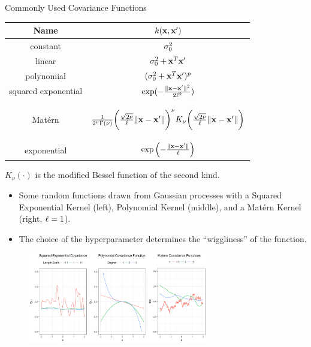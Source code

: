 \begin{frame}[c,allowframebreaks]{Commonly Used Covariance Functions}


\begin{table}[]
\centering
\begin{tabular}{|c|c|}
\hline
Name & $k(\mathbf{x}, \mathbf{x}^\prime)$\\
\hline
constant & $\sigma^2_0$ \\ [1em]
linear & $\sigma^2_0 + \mathbf{x}^T\mathbf{x}^\prime$ \\ [1em]
polynomial & $(\sigma^2_0 + \mathbf{x}^T\mathbf{x}^\prime)^p$ \\ [1em]
squared exponential & $\exp(- \frac{\|\mathbf{x} - \mathbf{x}^\prime\|^2}{2\ell^2})$ \\ [1em]
Matérn & \begin{footnotesize} $\frac{1}{2^\nu \Gamma(\nu)}\biggl(\frac{\sqrt{2 \nu}}{\ell}\|\mathbf{x} - \mathbf{x}^\prime\|\biggr)^{\nu} K_\nu\biggl(\frac{\sqrt{2 \nu}}{\ell}\|\mathbf{x} - \mathbf{x}^\prime\|\biggr)$\end{footnotesize}  \\ [1em]
exponential & $\exp\left(- \frac{\|\mathbf{x} - \mathbf{x}^\prime\|}{\ell}\right)$ \\ [1em]
\hline
\end{tabular}
\end{table}
\begin{footnotesize}
\centering
$K_\nu(\cdot)$ is the modified Bessel function of the second kind.
\end{footnotesize}

\framebreak

\begin{itemize}
\item[\faLightbulbO] Some random functions drawn from Gaussian processes with a Squared Exponential Kernel (left), Polynomial Kernel (middle), and a Matérn Kernel (right, $\ell = 1$). 
\item[\faLightbulbO] The choice of the hyperparameter determines the ``wiggliness'' of the function.
\end{itemize}

\begin{figure}
\includegraphics[width=0.7\textwidth]{figure_man/covariance.png}
\end{figure}




\end{frame}


